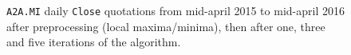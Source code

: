 \documentclass[a4paper]{article}
\begin{document}
\begin{figure}%
	
	
	
	
	
	\caption{\texttt{A2A.MI} daily \texttt{Close} quotations from mid-april 2015 to mid-april 2016 after preprocessing (local maxima/minima), then after one, three and five iterations of the algorithm.}\label{fig:python}

\end{figure}


\clearpage %
\end{document}
